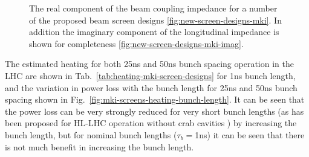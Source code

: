 \begin{figure}
\begin{center}
\end{center}
\caption{The real component of the beam coupling impedance for a number of the proposed beam screen designs \ref{fig:new-screen-designs-mki}. In addition the imaginary component of the longitudinal impedance is shown for completeness \ref{fig:new-screen-designs-mki-imag}.}
\end{figure}

The estimated heating for both 25ns and 50ns bunch spacing operation in the LHC are shown in Tab.~\ref{tab:heating-mki-screen-designs} for 1ns bunch length, and the variation in power loss with the bunch length for 25ns and 50ns bunch spacing shown in Fig.~\ref{fig:mki-screens-heating-bunch-length}. It can be seen that the power loss can be very strongly reduced for very short bunch lengths (as has been proposed for HL-LHC operation without crab cavities \cite{Brüning:beamParameters}) by increasing the bunch length, but for nominal bunch lengths ($\tau_{b}=$1ns) it can be seen that there is not much benefit in increasing the bunch length.

